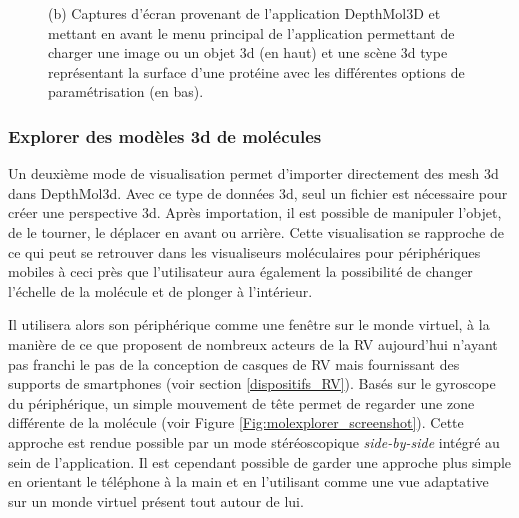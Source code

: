 \begin{figure}
{{(b) Captures d'écran provenant de l'application DepthMol3D et mettant en avant le menu principal de l'application permettant de charger une image ou un objet 3d (en haut) et une scène 3d type représentant la surface d'une protéine avec les différentes options de paramétrisation (en bas).}}
\end{figure}

\subsubsection{Explorer des modèles 3d de molécules}

Un deuxième mode de visualisation permet d'importer directement des mesh 3d dans DepthMol3d. Avec ce type de données 3d, seul un fichier est nécessaire pour créer une perspective 3d. Après importation, il est possible de manipuler l'objet, de le tourner, le déplacer en avant ou arrière. Cette visualisation se rapproche de ce qui peut se retrouver dans les visualiseurs moléculaires pour périphériques mobiles à ceci près que l'utilisateur aura également la possibilité de changer l'échelle de la molécule et de plonger à l'intérieur. 

Il utilisera alors son périphérique comme une fenêtre sur le monde virtuel, à la manière de ce que proposent de nombreux acteurs de la RV aujourd'hui n'ayant pas franchi le pas de la conception de casques de RV mais fournissant des supports de smartphones (voir section \ref{dispositifs_RV}). Basés sur le gyroscope du périphérique, un simple mouvement de tête permet de regarder une zone différente de la molécule (voir Figure \ref{Fig:molexplorer_screenshot}). Cette approche est rendue possible par un mode stéréoscopique \textit{side-by-side} intégré au sein de l'application. Il est cependant possible de garder une approche plus simple en orientant le téléphone à la main et en l'utilisant comme une vue adaptative sur un monde virtuel présent tout autour de lui.

